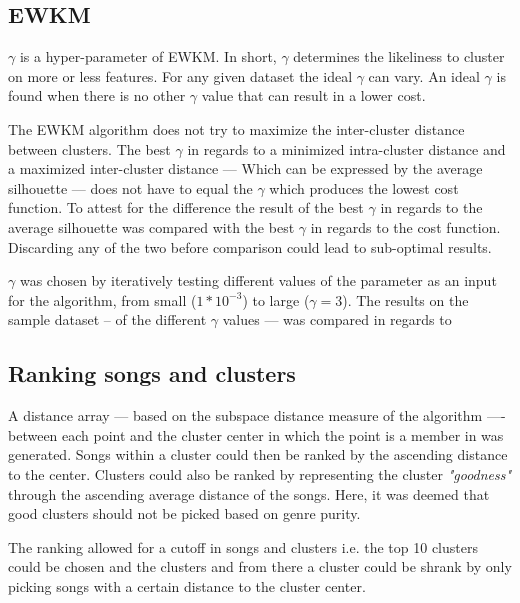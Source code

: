 \documentclass[../report.tex]{subfiles}
\begin{document}
\subsection{EWKM}
$\gamma$ is a hyper-parameter of EWKM. In short, $\gamma$ determines the likeliness to cluster on more or less features. For any given dataset the ideal $\gamma$ can vary. An ideal $\gamma$ is found when there is no other $\gamma$ value that can result in a lower cost.

The EWKM algorithm does not try to maximize the inter-cluster distance between clusters. The best $\gamma$ in regards to a minimized intra-cluster distance and a maximized inter-cluster distance --- Which can be expressed by the average silhouette --- does not have to equal the $\gamma$ which produces the lowest cost function. To attest for the difference the result of the best $\gamma$ in regards to the average silhouette was compared with the best $\gamma$ in regards to the cost function. Discarding any of the two before comparison could lead to sub-optimal results.

$\gamma$ was chosen by iteratively testing different values of the parameter as an input for the algorithm, from small ($1 * 10^{-3}$) to large ($\gamma = 3$).
The results on the sample dataset -- of the different $\gamma$ values --- was compared in regards to \color{red}{silhouette and purity.}





\subsection{Ranking songs and clusters}
A distance array --- based on the subspace distance measure of the algorithm ---- between each point and the cluster center in which the point is a member in was generated.  Songs within a cluster could then be ranked by the ascending distance to the center. Clusters could also be ranked by representing the cluster \textit{"goodness"} through the ascending average distance of the songs. Here, it was deemed that good clusters should not be picked based on genre purity.

The ranking allowed for a cutoff in songs and clusters i.e. the top 10 clusters could be chosen and the clusters and from there a cluster could be shrank by only picking songs with a certain distance to the cluster center.
\end{document}
